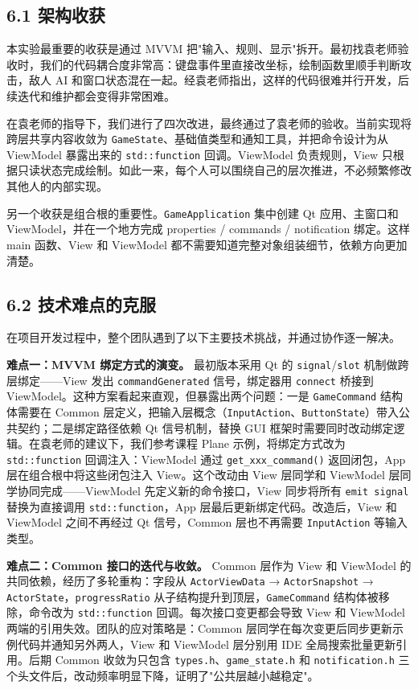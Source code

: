 \documentclass[12pt,fontset=none]{ctexart}
\begin{document}
\subsection{6.1 架构收获}

本实验最重要的收获是通过 MVVM 把"输入、规则、显示"拆开。最初找袁老师验收时，我们的代码耦合度非常高：键盘事件里直接改坐标，绘制函数里顺手判断攻击，敌人 AI 和窗口状态混在一起。经袁老师指出，这样的代码很难并行开发，后续迭代和维护都会变得非常困难。

在袁老师的指导下，我们进行了四次改进，最终通过了袁老师的验收。当前实现将跨层共享内容收敛为 \texttt{GameState}、基础值类型和通知工具，并把命令设计为从 ViewModel 暴露出来的 \texttt{std::function} 回调。ViewModel 负责规则，View 只根据只读状态完成绘制。如此一来，每个人可以围绕自己的层次推进，不必频繁修改其他人的内部实现。

另一个收获是组合根的重要性。\texttt{GameApplication} 集中创建 Qt 应用、主窗口和 ViewModel，并在一个地方完成 properties / commands / notification 绑定。这样 main 函数、View 和 ViewModel 都不需要知道完整对象组装细节，依赖方向更加清楚。


\subsection{6.2 技术难点的克服}

在项目开发过程中，整个团队遇到了以下主要技术挑战，并通过协作逐一解决。

\textbf{难点一：MVVM 绑定方式的演变。} 最初版本采用 Qt 的 \texttt{signal}/\texttt{slot} 机制做跨层绑定——View 发出 \texttt{commandGenerated} 信号，绑定器用 \texttt{connect} 桥接到 ViewModel。这种方案看起来直观，但暴露出两个问题：一是 \texttt{GameCommand} 结构体需要在 Common 层定义，把输入层概念（\texttt{InputAction}、\texttt{ButtonState}）带入公共契约；二是绑定路径依赖 Qt 信号机制，替换 GUI 框架时需要同时改动绑定逻辑。在袁老师的建议下，我们参考课程 Plane 示例，将绑定方式改为 \texttt{std::function} 回调注入：ViewModel 通过 \texttt{get\_xxx\_command()} 返回闭包，App 层在组合根中将这些闭包注入 View。这个改动由 View 层同学和 ViewModel 层同学协同完成——ViewModel 先定义新的命令接口，View 同步将所有 \texttt{emit signal} 替换为直接调用 \texttt{std::function}，App 层最后更新绑定代码。改造后，View 和 ViewModel 之间不再经过 Qt 信号，Common 层也不再需要 \texttt{InputAction} 等输入类型。

\textbf{难点二：Common 接口的迭代与收敛。} Common 层作为 View 和 ViewModel 的共同依赖，经历了多轮重构：字段从 \texttt{ActorViewData} → \texttt{ActorSnapshot} → \texttt{ActorState}，\texttt{progressRatio} 从子结构提升到顶层，\texttt{GameCommand} 结构体被移除，命令改为 \texttt{std::function} 回调。每次接口变更都会导致 View 和 ViewModel 两端的引用失效。团队的应对策略是：Common 层同学在每次变更后同步更新示例代码并通知另外两人，View 和 ViewModel 层分别用 IDE 全局搜索批量更新引用。后期 Common 收敛为只包含 \texttt{types.h}、\texttt{game\_state.h} 和 \texttt{notification.h} 三个头文件后，改动频率明显下降，证明了"公共层越小越稳定"。
\end{document}
